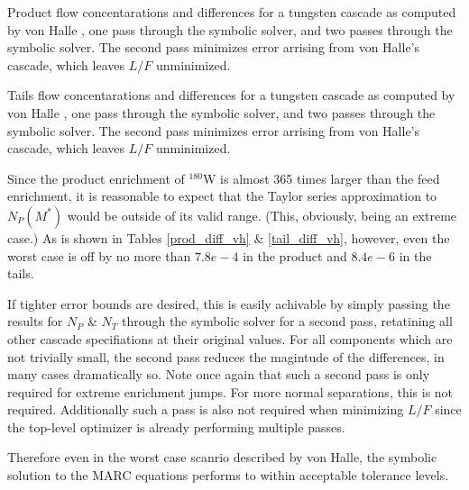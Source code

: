\documentclass[preprint,12pt]{elsarticle}
\newcommand{\superscript}[1]{\ensuremath{^{\textrm{#1}}}}
\newcommand{\nuc}[2]{\superscript{#2}{#1}}
\begin{document}
\begin{table}[htbp]
\begin{center}
\caption{Product flow concentarations and differences for a tungsten cascade as 
computed by  von Halle \cite{VonHalle1987}, one pass through the symbolic solver, 
and two passes through the symbolic solver.  The second pass minimizes error arrising
from von Halle's cascade, which leaves $L/F$ unminimized.}

\end{center}
\label{prod_diff_vh}
\end{table}

\begin{table}[htbp]
\begin{center}
\caption{Tails flow concentarations and differences for a tungsten cascade as 
computed by  von Halle \cite{VonHalle1987}, one pass through the symbolic solver, 
and two passes through the symbolic solver.  The second pass minimizes error arrising 
from von Halle's cascade, which leaves $L/F$ unminimized.}

\end{center}
\label{tail_diff_vh}
\end{table}

Since the product enrichment of \nuc{W}{180} is almost 365 times larger than the feed
enrichment, it is reasonable to expect that the Taylor series approximation to 
$N_P(M^*)$ would be outside of its valid range.  (This, obviously, being an extreme
case.)  As is shown in Tables \ref{prod_diff_vh} \& \ref{tail_diff_vh}, however, 
even the worst case is off by no more than $7.8e-4$ in the product and $8.4e-6$ in the
tails.  

If tighter error bounds are desired, this is easily achivable by simply passing
the results for $N_P$ \& $N_T$ through the symbolic solver for a second pass, 
retatining all other cascade specifiations at their original values.  For all 
components which are not trivially small, the second pass reduces the magintude of the 
differences, in many cases dramatically so.  Note once again that such a second 
pass is only required for extreme enrichment jumps.  For more normal separations, 
this is not required.  Additionally such a pass is also not required when minimizing
$L/F$ since the top-level optimizer is already performing multiple passes.

Therefore even in the worst case scanrio described by von Halle, the symbolic 
solution to the MARC equations performs to within acceptable tolerance levels.
\end{document}
